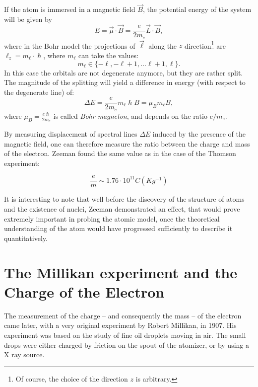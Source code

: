If the atom is immersed in a magnetic field $\vec{B}$, the potential energy of the system will be given by
\begin{equation*} E = \vec{\mu} \cdot \vec{B} = \frac{e}{2 m_e} \vec{L} \cdot \vec{B}, \end{equation*}
where in the Bohr model the projections of $\vec{\ell}$ along the $z$ direction\footnote{Of course, the choice of the direction $z$ is arbitrary.} are $\ell_z = m_{\ell} \cdot \hslash$, where $m_{\ell}$ can take the values:
\begin{equation*} m_{\ell} \in \{ -\ell, -\ell+1, \dots \ell+1, \ell \}.\end{equation*}
In this case the orbitals are not degenerate anymore, but they are rather split. The magnitude of the splitting will yield a difference in energy (with respect to the degenerate line) of:
\begin{equation*} \Delta E = \frac{e}{2 m_e}m_{\ell} \hslash B = \mu_B m_{\ell} B,\end{equation*}
\noindent where $\mu_B = \frac{e \hslash}{2 m_e}$ is called \emph{Bohr magneton}, and depends on the ratio $e/m_e$.

By measuring displacement of spectral lines $\Delta E$ induced by the presence of the magnetic field, one can therefore measure the ratio between the charge and mass of the electron. Zeeman found the same value as in the case of the Thomson experiment:

$$ \frac{e}{m} \sim 1.76 \cdot 10^{11} C (Kg^{-1})$$

It is interesting to note that well before the discovery of the structure of atoms and the existence of nuclei, Zeeman demonstrated an effect, that would prove extremely important in probing the atomic model, once the theoretical understanding of the atom would have progressed sufficiently to describe it quantitatively.  \\

\section{The Millikan experiment and the Charge of the Electron}

The measurement of the charge -- and consequently the mass -- of the electron came later, with a very original experiment by Robert Millikan, in 1907. His experiment was based on  the study of fine oil droplets moving in air. The small drops were either charged by friction on the spout of the atomizer, or by using a X ray source.\\

